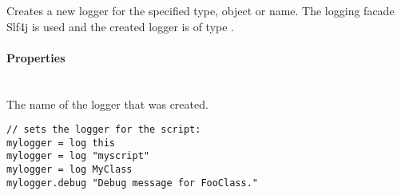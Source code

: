 %


Creates a new logger for the specified type, object or name.
The logging facade Slf4j\cite{slf4j13} is used and the created logger 
is of type \cite{logger13}.

\paragraph{Properties}

\begin{asparadesc}
%
\item[\code{name}] \hfill \\
The name of the logger that was created.
%
\end{asparadesc}

\begin{lstlisting}[style=Groovybash, label={lst:example_log}]
// sets the logger for the script:
mylogger = log this
mylogger = log "myscript"
mylogger = log MyClass
mylogger.debug "Debug message for FooClass."
\end{lstlisting}


